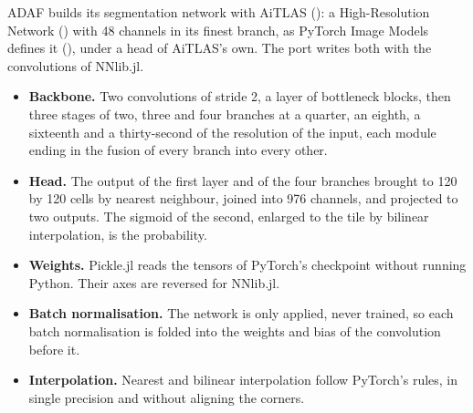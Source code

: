 ADAF builds its segmentation network with AiTLAS
(): a High-Resolution
Network () with 48 channels in its finest branch, as PyTorch Image Models
defines it (), under a head of AiTLAS's own. The port writes both with the
convolutions of NNlib.jl.
\begin{itemize}
\item \textbf{Backbone.} Two convolutions of stride 2, a layer of bottleneck blocks, then three stages of two, three
  and four branches at a quarter, an eighth, a sixteenth and a thirty-second of the resolution of the input, each
  module ending in the fusion of every branch into every other.
\item \textbf{Head.} The output of the first layer and of the four branches brought to 120 by 120 cells by nearest
  neighbour, joined into 976 channels, and projected to two outputs. The sigmoid of the second, enlarged to the tile by
  bilinear interpolation, is the probability.
\item \textbf{Weights.} Pickle.jl reads the tensors of PyTorch's checkpoint without running Python. Their axes are
  reversed for NNlib.jl.
\item \textbf{Batch normalisation.} The network is only applied, never trained, so each batch normalisation is folded
  into the weights and bias of the convolution before it.
\item \textbf{Interpolation.} Nearest and bilinear interpolation follow PyTorch's rules, in single precision and
  without aligning the corners.
\end{itemize}


